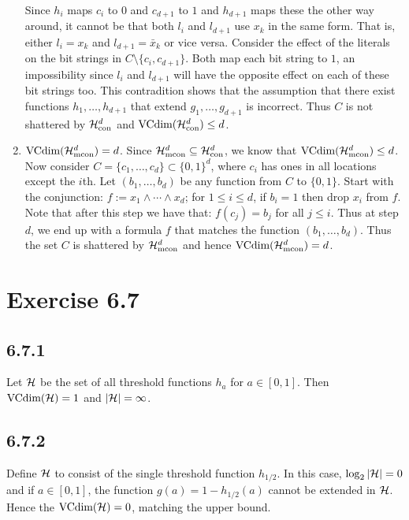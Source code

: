 \begin{enumerate}
        Since $h_i$ maps $c_i$ to $0$ and $c_{d + 1}$ to $1$ and $h_{d + 1}$ maps
        these the other way around, it cannot be that both $l_i$ and $l_{d + 1}$
        use $x_k$ in the same form. That is, either $l_i = x_k$ and $l_{d+1} =
        \bar{x}_k$ or vice versa. Consider the effect of the literals on the
        bit strings in $C \setminus \{c_i, c_{d+1}\}$. Both map each bit string to
        $1$, an impossibility since $l_i$ and $l_{d + 1}$ will have the opposite
        effect on each of these bit strings too. This contradition shows that the
        assumption that there exist functions $h_1, \ldots, h_{d + 1}$ that extend
        $g_1, \ldots, g_{d + 1}$ is incorrect. Thus $C$ is not shattered by $\mathcal{H}_{\text{con}}^{d}$
        and $\text{VCdim} (\mathcal{H}_{\text{con}}^{d}) \leq d$.

    \item $\text{VCdim} (\mathcal{H}_{\text{mcon}}^{d}) = d$. Since $\mathcal{H}_{\text{mcon}}^{d} \subseteq \mathcal{H}_{\text{con}}^{d}$, we know
        that $\text{VCdim} (\mathcal{H}_{\text{mcon}}^{d}) \leq d$. Now consider $C = \{c_1, \ldots, c_d\}
        \subset \{0, 1\}^d$, where $c_i$ has ones in all locations except the $i$th.
        Let $(b_1, \ldots, b_d)$ be any function from $C$ to $\{0, 1\}$.
        Start with the conjunction: $f := x_1 \wedge
        \cdots \wedge x_{d}$; for $1 \leq i \leq d$,
        if $b_i = 1$ then drop $x_i$ from $f$.
        Note that after this step we have that: $f(c_j) = b_j$ for all $j \leq i$.
        Thus at step $d$, we end up with a formula $f$ that matches the function
        $(b_1, \ldots, b_d)$.
        Thus the set $C$ is shattered by $\mathcal{H}_{\text{mcon}}^{d}$ and hence
        $\text{VCdim} (\mathcal{H}_{\text{mcon}}^{d}) = d$.
\end{enumerate}

\section*{Exercise 6.7}

\subsection*{6.7.1} Let $\mathcal{H}$ be the set of all threshold functions $h_a$
for $a \in [0, 1]$. Then $\text{VCdim} (\mathcal{H}) = 1$ and  $|\mathcal{H}| = \infty$.

\subsection*{6.7.2} Define $\mathcal{H}$ to consist of the single threshold function
$h_{1/2}$. In this case, $\log_2 |\mathcal{H}| = 0$ and if $a \in [0, 1]$, the
function $g(a) = 1 - h_{1/2}(a)$ cannot be extended in $\mathcal{H}$. Hence the
$\text{VCdim} (\mathcal{H}) = 0$, matching the upper bound.



